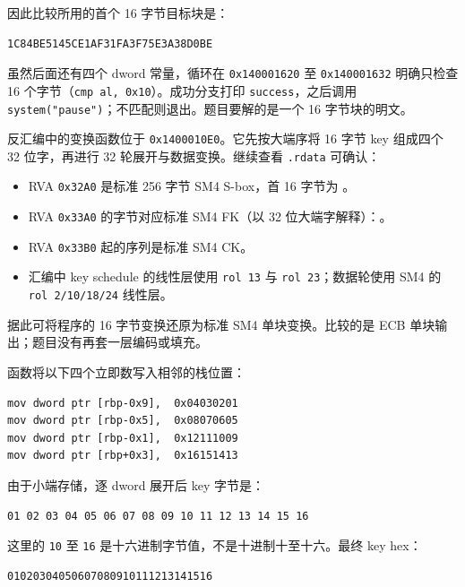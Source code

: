 因此比较所用的首个 16 字节目标块是：

\begin{verbatim}
1C84BE5145CE1AF31FA3F75E3A38D0BE
\end{verbatim}

虽然后面还有四个 dword 常量，循环在 \texttt{0x140001620} 至 \texttt{0x140001632} 明确只检查 16 个字节（\texttt{cmp\ al,\ 0x10}）。成功分支打印 \texttt{success}，之后调用 \texttt{system("pause")}；不匹配则退出。题目要解的是一个 16 字节块的明文。

反汇编中的变换函数位于 \texttt{0x1400010E0}。它先按大端序将 16 字节 key 组成四个 32 位字，再进行 32 轮展开与数据变换。继续查看 \texttt{.rdata} 可确认：

\begin{itemize}
\tightlist
\item
  RVA \texttt{0x32A0} 是标准 256 字节 SM4 S-box，首 16 字节为 \texttt{}。
\item
  RVA \texttt{0x33A0} 的字节对应标准 SM4 FK（以 32 位大端字解释）：\texttt{}。
\item
  RVA \texttt{0x33B0} 起的序列是标准 SM4 CK。
\item
  汇编中 key schedule 的线性层使用 \texttt{rol\ 13} 与 \texttt{rol\ 23}；数据轮使用 SM4 的 \texttt{rol\ 2/10/18/24} 线性层。
\end{itemize}

据此可将程序的 16 字节变换还原为标准 SM4 单块变换。比较的是 ECB 单块输出；题目没有再套一层编码或填充。

函数将以下四个立即数写入相邻的栈位置：

\begin{verbatim}
mov dword ptr [rbp-0x9],  0x04030201
mov dword ptr [rbp-0x5],  0x08070605
mov dword ptr [rbp-0x1],  0x12111009
mov dword ptr [rbp+0x3],  0x16151413
\end{verbatim}

由于小端存储，逐 dword 展开后 key 字节是：

\begin{verbatim}
01 02 03 04 05 06 07 08 09 10 11 12 13 14 15 16
\end{verbatim}

这里的 \texttt{10} 至 \texttt{16} 是十六进制字节值，不是十进制十至十六。最终 key hex：

\begin{verbatim}
01020304050607080910111213141516
\end{verbatim}

